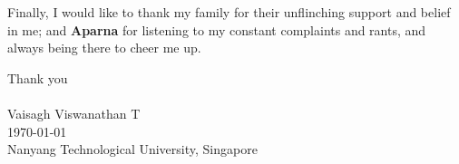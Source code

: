 \begin{acknowledgements}
Finally, I would like to thank my family for their unflinching support and belief in me; and \textbf{Aparna} for listening to my constant complaints and rants, and always being there to cheer me up.

Thank you
\\
\\
\hspace{0in}
Vaisagh Viswanathan T\\
\today\\
{Nanyang Technological University, Singapore}\\
\end{acknowledgements}